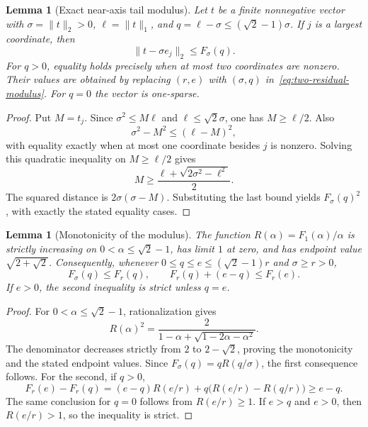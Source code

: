 \documentclass[11pt]{article}
\newtheorem{lemma}[theorem]{Lemma}
\theoremstyle{remark}\newtheorem{remark}[theorem]{Remark}
\begin{document}
\begin{lemma}[Exact near-axis tail modulus]\label{lem:exact-tail-modulus}
Let $t$ be a finite nonnegative vector with $\sigma=\|t\|_2>0$,
$\ell=\|t\|_1$, and $q=\ell-\sigma\le(\sqrt2-1)\sigma$.
If $j$ is a largest coordinate, then
\[
 \|t-\sigma e_j\|_2\le F_\sigma(q).
\]
For $q>0$, equality holds precisely when at most two coordinates are
nonzero. Their values are obtained by replacing $(r,e)$ with $(\sigma,q)$
in~\eqref{eq:two-residual-modulus}. For $q=0$ the vector is one-sparse.
\end{lemma}
\begin{proof}
Put $M=t_j$. Since $\sigma^2\le M\ell$ and $\ell\le\sqrt2\sigma$,
one has $M\ge\ell/2$. Also
\[
 \sigma^2-M^2\le(\ell-M)^2,
\]
with equality exactly when at most one coordinate besides $j$ is
nonzero. Solving this quadratic inequality on $M\ge\ell/2$ gives
\[
 M\ge\frac{\ell+\sqrt{2\sigma^2-\ell^2}}2.
\]
The squared distance is $2\sigma(\sigma-M)$. Substituting the last
bound yields $F_\sigma(q)^2$, with exactly the stated equality cases.
\end{proof}

\begin{lemma}[Monotonicity of the modulus]\label{lem:modulus-monotonicity}
The function $R(\alpha)=F_1(\alpha)/\alpha$ is strictly increasing on
$0<\alpha\le\sqrt2-1$, has limit $1$ at zero, and has endpoint value
$\sqrt{2+\sqrt2}$. Consequently, whenever $0\le q\le e\le(\sqrt2-1)r$
and $\sigma\ge r>0$,
\[
 F_\sigma(q)\le F_r(q),\qquad F_r(q)+(e-q)\le F_r(e).
\]
If $e>0$, the second inequality is strict unless $q=e$.
\end{lemma}
\begin{proof}
For $0<\alpha\le\sqrt2-1$, rationalization gives
\[
 R(\alpha)^2=
 \frac{2}{1-\alpha+\sqrt{1-2\alpha-\alpha^2}}.
\]
The denominator decreases strictly from $2$ to $2-\sqrt2$, proving
the monotonicity and the stated endpoint values.
Since $F_\sigma(q)=qR(q/\sigma)$, the first consequence follows.
For the second, if $q>0$,
\[
 F_r(e)-F_r(q)
 =(e-q)R(e/r)+q\bigl(R(e/r)-R(q/r)\bigr)\ge e-q.
\]
The same conclusion for $q=0$ follows from $R(e/r)\ge1$.
If $e>q$ and $e>0$, then $R(e/r)>1$, so the inequality is strict.
\end{proof}
\end{document}
